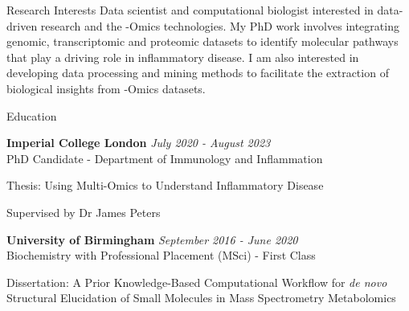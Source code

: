 \documentclass{resume}
\begin{document}
\begin{rSection}{Research Interests}
\vspace{1pt plus 1pt}
Data scientist and computational biologist interested in data-driven research and the -Omics technologies. My PhD work involves integrating genomic, transcriptomic and proteomic datasets to identify molecular pathways that play a driving role in inflammatory disease. I am also interested in developing data processing and mining methods to facilitate the extraction of biological insights from -Omics datasets.

\end{rSection}
\begin{rSection}{Education}

\vspace{1pt plus 1pt}
{\bf Imperial College London} \hfill {\em July 2020 - August 2023} 
\\ PhD Candidate - Department of Immunology and Inflammation

\vspace{2pt plus 1pt minus 1pt}
\item Thesis: Using Multi-Omics to Understand Inflammatory Disease
\item Supervised by Dr James Peters

\smallskip

{\bf University of Birmingham} \hfill {\em September 2016 - June 2020} 
\\ Biochemistry with Professional Placement (MSci) - First Class

\vspace{2pt plus 1pt minus 1pt}
\item Dissertation: A Prior Knowledge-Based Computational Workflow for \textit{de novo} Structural Elucidation of Small Molecules in Mass Spectrometry Metabolomics

\end{rSection}

\end{document}
